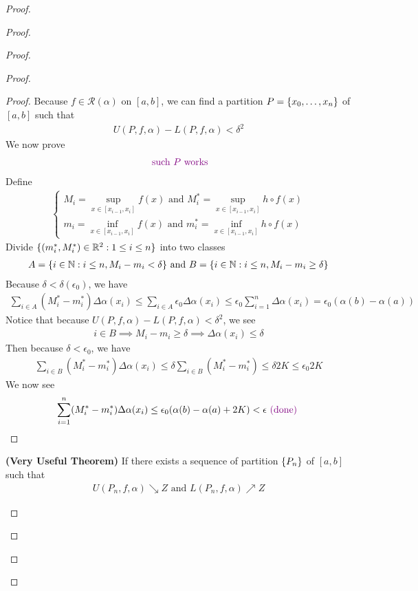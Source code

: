 \documentclass{report}
\begin{document}
\begin{proof}
\begin{proof}
\begin{proof}
\begin{proof}
\begin{proof}
Because $f\in \mathscr{R}(\alpha )$ on $[a,b]$, we can find a partition $P=\{ x_0,\dots ,x_n \}$ of $[a,b]$ such that 
\begin{align*}
U(P,f,\alpha )-L(P,f,\alpha )<\delta^2
\end{align*}
We now prove 
\begin{align*}
\textcolor{violet}{\text{ such $P$ works}}
\end{align*}
Define 
\begin{align*}
  \begin{cases}
    M_i=\sup_{x\in [x_{i-1},x_i]} f(x)\text{ and }M_i^*=\sup_{x\in [x_{i-1},x_i]}h \circ f(x)\\
    m_i=\inf_{x\in [x_{i-1},x_i]} f(x)\text{ and }m_i^*=\inf_{x\in [x_{i-1},x_i]}h \circ f(x)
  \end{cases}
\end{align*}
Divide $\{ (m_i^*,M_i^*)\in\mathbb{R}^2:1\leq i\leq n \}$ into two classes
\begin{align*}
 A= \{ i\in\mathbb{N}: i\leq n,M_i - m_i <\delta \}\text{ and }B=\{ i\in\mathbb{N}:i\leq n,M_i-m_i \geq \delta \}
\end{align*}
Because $\delta<\delta(\epsilon_0 )$, we have
\begin{align*}
\sum_{i \in A}(M_i^*-m_i^*)\Delta \alpha (x_i) \leq \sum_{i \in A}\epsilon_0 \Delta \alpha (x_i)\leq \epsilon_0 \sum_{i=1}^n \Delta \alpha (x_i)=\epsilon_0(\alpha (b)-\alpha (a))
\end{align*}
Notice that because $U(P,f,\alpha )-L(P,f,\alpha )<\delta^2$, we see 
\begin{align*}
i \in B \implies M_i-m_i\geq \delta \implies \Delta \alpha (x_i)\leq \delta
\end{align*}
Then because $\delta<\epsilon_0 $, we have 
\begin{align*}
\sum_{i \in B}(M_i^*-m_i^*)\Delta \alpha (x_i)\leq \delta \sum_{i \in B} (M_i^*-m_i^*)\leq \delta 2K\leq \epsilon_0  2K
\end{align*}
We now see 
\begin{align*}
  \sum_{i=1}^n (M_i^*-m_i^*)\Delta \alpha (x_i)\leq \epsilon_0(\alpha (b)-\alpha (a)+2K)<\epsilon \textcolor{violet}{\text{ (done) }}
\end{align*}
\end{proof}
\begin{theorem}
\label{7.1.18}
\textbf{(Very Useful Theorem)} If there exists a sequence of partition $\{ P_n \}$ of $[a,b]$ such that 
\begin{align*}
U(P_n,f,\alpha ) \searrow Z \text{ and } L(P_n,f,\alpha )\nearrow Z
\end{align*}

\end{theorem}
\end{proof}
\end{proof}
\end{proof}
\end{proof}
\end{document}
